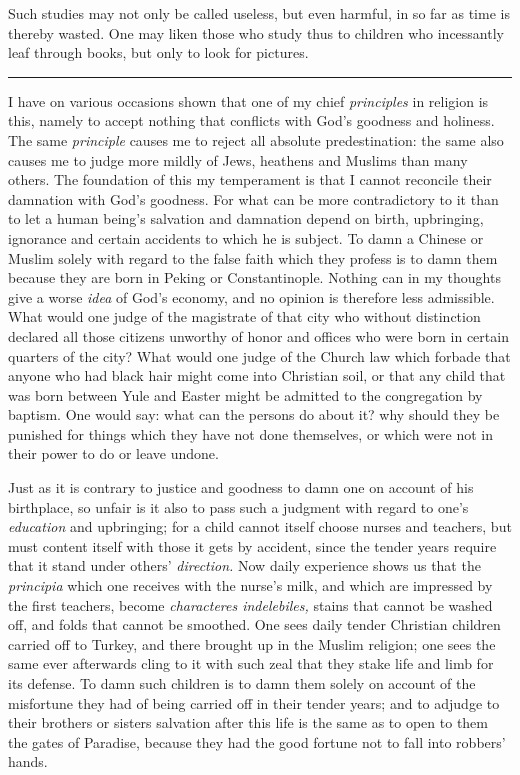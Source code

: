 \documentclass[12pt,a4paper,openany]{book}
\newcommand{\opage}[1]{\marginnote{\footnotesize\textit{[#1]}}}
\newcommand{\sectionrule}{\par\begin{center}\rule{4em}{0.4pt}\end{center}}
\begin{document}
Such studies may not only be called useless, but even harmful, in so far as time
is thereby wasted. One may liken those who study thus to children who incessantly
leaf through books, but only to look for pictures.

\sectionrule

I have on various occasions shown that one of my chief \textit{principles} in
religion is this, namely to accept nothing that conflicts with God's goodness
and holiness. The same \textit{principle} causes me to reject all absolute
predestination: the same also causes me to judge more mildly of Jews, heathens and
Muslims than many others. The foundation of this my temperament is that I
cannot reconcile their damnation with God's goodness. For what can be more
contradictory to it than to let a human being's salvation and damnation depend on
birth, upbringing, ignorance and certain accidents to which he is subject. To damn
a Chinese or Muslim solely with regard to the false faith which they profess
is to damn them because they are born in Peking or Constantinople. Nothing can in
my thoughts give a worse \textit{idea} of God's economy, and no opinion is
therefore less admissible. What would one judge of the magistrate of that city who
without distinction declared all those citizens unworthy of honor and offices who
were born in certain quarters of the city? What would one judge of the Church law
which forbade that anyone who had
\setcounter{footnote}{0}%
\opage{24}black hair might come into Christian soil, or that any child that was born
between Yule and Easter might be admitted to the congregation by baptism. One
would say: what can the persons do about it? why should they be punished for
things which they have not done themselves, or which were not in their power to do
or leave undone.

Just as it is contrary to justice and goodness to damn one on account of his
birthplace, so unfair is it also to pass such a judgment with regard to one's
\textit{education} and upbringing; for a child cannot itself choose nurses and
teachers, but must content itself with those it gets by accident, since the
tender years require that it stand under others' \textit{direction.} Now daily
experience shows us that the \textit{principia} which one receives with the
nurse's milk, and which are impressed by the first teachers, become
\textit{characteres indelebiles,} stains that cannot be washed off, and folds that
cannot be smoothed. One sees daily tender Christian children carried off to
Turkey, and there brought up in the Muslim religion; one sees the same ever
afterwards cling to it with such zeal that they stake life and limb for its
defense. To damn such children is to damn them solely on account of the
misfortune they had of being carried off in their tender years; and to adjudge to
their brothers or sisters salvation after this life is the same as to open to them
the gates of Paradise, because they had the good fortune not to fall into robbers'
hands.
\end{document}
